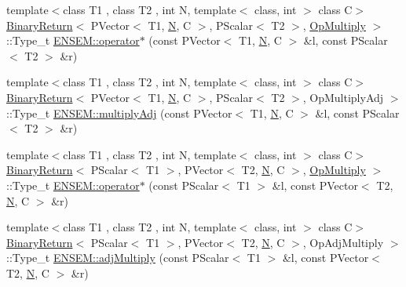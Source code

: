 \begin{DoxyCompactItemize}
{\footnotesize template$<$class T1 , class T2 , int N, template$<$ class, int $>$ class C$>$ }\\\mbox{\hyperlink{structBinaryReturn}{Binary\+Return}}$<$ P\+Vector$<$ T1, \mbox{\hyperlink{adat__devel_2lib_2hadron_2operator__name__util_8cc_a7722c8ecbb62d99aee7ce68b1752f337}{N}}, C $>$, P\+Scalar$<$ T2 $>$, \mbox{\hyperlink{structOpMultiply}{Op\+Multiply}} $>$\+::Type\+\_\+t \mbox{\hyperlink{group__primvector_ga345fa1d5e68f5801446f6ff69feb2121}{E\+N\+S\+E\+M\+::operator$\ast$}} (const P\+Vector$<$ T1, \mbox{\hyperlink{adat__devel_2lib_2hadron_2operator__name__util_8cc_a7722c8ecbb62d99aee7ce68b1752f337}{N}}, C $>$ \&l, const P\+Scalar$<$ T2 $>$ \&r)
\item 
{\footnotesize template$<$class T1 , class T2 , int N, template$<$ class, int $>$ class C$>$ }\\\mbox{\hyperlink{structBinaryReturn}{Binary\+Return}}$<$ P\+Vector$<$ T1, \mbox{\hyperlink{adat__devel_2lib_2hadron_2operator__name__util_8cc_a7722c8ecbb62d99aee7ce68b1752f337}{N}}, C $>$, P\+Scalar$<$ T2 $>$, Op\+Multiply\+Adj $>$\+::Type\+\_\+t \mbox{\hyperlink{group__primvector_gab03f792e64e0e2073c0ab9f04fa4518f}{E\+N\+S\+E\+M\+::multiply\+Adj}} (const P\+Vector$<$ T1, \mbox{\hyperlink{adat__devel_2lib_2hadron_2operator__name__util_8cc_a7722c8ecbb62d99aee7ce68b1752f337}{N}}, C $>$ \&l, const P\+Scalar$<$ T2 $>$ \&r)
\item 
{\footnotesize template$<$class T1 , class T2 , int N, template$<$ class, int $>$ class C$>$ }\\\mbox{\hyperlink{structBinaryReturn}{Binary\+Return}}$<$ P\+Scalar$<$ T1 $>$, P\+Vector$<$ T2, \mbox{\hyperlink{adat__devel_2lib_2hadron_2operator__name__util_8cc_a7722c8ecbb62d99aee7ce68b1752f337}{N}}, C $>$, \mbox{\hyperlink{structOpMultiply}{Op\+Multiply}} $>$\+::Type\+\_\+t \mbox{\hyperlink{group__primvector_ga8312ce5cc507ffa0b4b203b976d05f47}{E\+N\+S\+E\+M\+::operator$\ast$}} (const P\+Scalar$<$ T1 $>$ \&l, const P\+Vector$<$ T2, \mbox{\hyperlink{adat__devel_2lib_2hadron_2operator__name__util_8cc_a7722c8ecbb62d99aee7ce68b1752f337}{N}}, C $>$ \&r)
\item 
{\footnotesize template$<$class T1 , class T2 , int N, template$<$ class, int $>$ class C$>$ }\\\mbox{\hyperlink{structBinaryReturn}{Binary\+Return}}$<$ P\+Scalar$<$ T1 $>$, P\+Vector$<$ T2, \mbox{\hyperlink{adat__devel_2lib_2hadron_2operator__name__util_8cc_a7722c8ecbb62d99aee7ce68b1752f337}{N}}, C $>$, Op\+Adj\+Multiply $>$\+::Type\+\_\+t \mbox{\hyperlink{group__primvector_ga8b4f68b7aa172234ddbd8490f45bb13c}{E\+N\+S\+E\+M\+::adj\+Multiply}} (const P\+Scalar$<$ T1 $>$ \&l, const P\+Vector$<$ T2, \mbox{\hyperlink{adat__devel_2lib_2hadron_2operator__name__util_8cc_a7722c8ecbb62d99aee7ce68b1752f337}{N}}, C $>$ \&r)

\end{DoxyCompactItemize}
